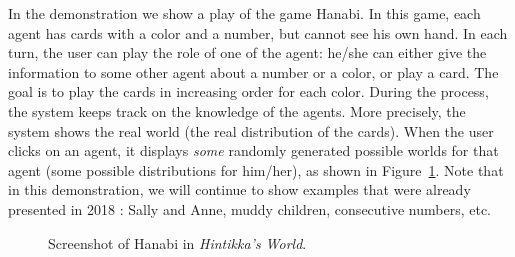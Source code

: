 
In the demonstration we show a play of the game Hanabi. 
In this game, each agent has cards with a color and a
number, but cannot see his own hand.
In each turn, the user can play the role of one of the agent: he/she can either give the information to some other agent about a number or a color, or play a card. The goal is to play the cards in increasing order for each color.
During the process, the system keeps track on the knowledge of the agents.
More precisely, the system shows the real world (the real distribution of the cards). When the user clicks on an agent, it displays \emph{some} randomly generated possible worlds for that agent (some possible distributions for him/her), as shown in Figure~\ref{figure:guihanabi}.
%
%
%
Note that in this demonstration, we will continue to show examples that were already presented in 2018 \cite{DBLP:conf/ijcai/Schwarzentruber18}: Sally and Anne, muddy children, consecutive numbers, etc.

\begin{figure}
	\begin{center}
		
	\end{center}
	\caption{Screenshot of Hanabi in \emph{Hintikka's World}.\label{figure:guihanabi}}
\end{figure}
